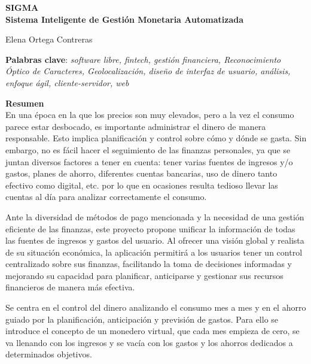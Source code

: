 \thispagestyle{empty}

\begin{center}
{\large\bfseries SIGMA \\ Sistema Inteligente de Gestión Monetaria Automatizada }\\
\end{center}
\begin{center}
Elena Ortega Contreras\\
\end{center}


\vspace{0.5cm}
\noindent\textbf{Palabras clave}: \textit{software libre, fintech, gestión financiera, Reconocimiento Óptico de Caracteres, Geolocalización, diseño de interfaz de usuario, análisis, enfoque ágil, cliente-servidor, web}
\vspace{0.7cm}

\noindent\textbf{Resumen}\\

En una época en la que los precios son muy elevados, pero a la vez el consumo parece estar desbocado, es importante administrar el dinero de manera responsable. Esto implica planificación y control sobre cómo y dónde se gasta. Sin embargo, no es fácil hacer el seguimiento de las finanzas personales, ya que se juntan diversos factores a tener en cuenta: tener varias fuentes de ingresos y/o gastos, planes de ahorro, diferentes cuentas bancarias, uso de dinero tanto efectivo como digital, etc. por lo que en ocasiones resulta tedioso llevar las cuentas al día para analizar correctamente el consumo.

Ante la diversidad de métodos de pago mencionada y la necesidad de una gestión eficiente de las finanzas, este proyecto propone unificar la información de todas las fuentes de ingresos y gastos del usuario. Al ofrecer una visión global y realista de su situación económica, la aplicación permitirá a los usuarios tener un control centralizado sobre sus finanzas, facilitando la toma de decisiones informadas y mejorando su capacidad para planificar, anticiparse y gestionar sus recursos financieros de manera más efectiva.

Se centra en el control del dinero analizando el consumo mes a mes y en el ahorro guiado por la planificación, anticipación y previsión de gastos. Para ello se introduce el concepto de un monedero virtual, que cada mes empieza de cero, se va llenando con los ingresos y se vacía con los gastos y los ahorros dedicados a determinados objetivos. 

